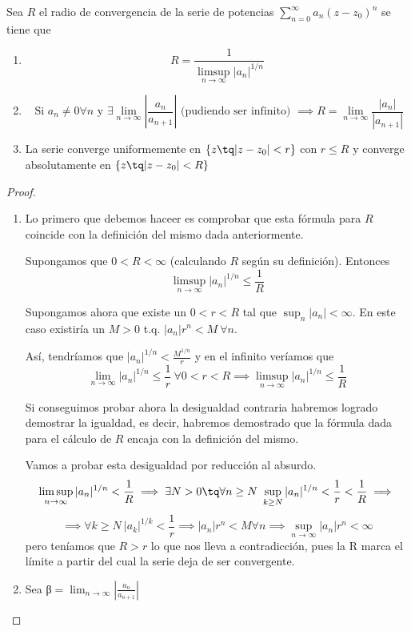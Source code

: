 \documentclass{apuntes}
\begin{document}
\begin{theorem}
Sea $R$ el radio de convergencia de la serie de potencias $\sum_{n=0}^{\infty} a_n (z-z_0)^n$ se tiene que
\begin{enumerate}
\item \[R = \frac{1}{\limsup_{n \to \infty} |a_n|^{1/n}}\]
\item
\[\text{ Si } a_n \neq 0 \forall n \text{ y }\exists \lim_{n \to \infty} \left|\frac{a_n}{a_{n+1}}\right| \text{ (pudiendo ser infinito) } \implies R = \lim_{n \to \infty}\frac{|a_n|}{|a_{n+1}|}\]
\item
La serie converge uniformemente en $\{z \tq |z-z_0| < r\}$ con $r \leq R$ y converge absolutamente en $\{z \tq |z-z_0|<R\}$
\end{enumerate}
\end{theorem}
\begin{proof}

\begin{enumerate}
\item Lo primero que debemos haceer es comprobar que esta fórmula para $R$ coincide con la definición del mismo dada anteriormente.

Supongamos que $0<R<\infty$ (calculando $R$ según su definición). Entonces
\[\limsup_{n \to \infty} |a_n|^{1/n} \leq \frac{1}{R}\]

Supongamos ahora que existe un $0<r<R$ tal que $\sup_n |a_n|<\infty$. En este caso existiría un $M>0$ t.q. $|a_n|r^n < M \ \forall n$.

Así, tendríamos que $|a_n|^{1/n} < \frac{M^{1/n}}{r}$ y en el infinito veríamos que
\[\lim_{n \to \infty} |a_n|^{1/n} \leq \frac{1}{r} \ \forall 0<r < R \implies \limsup_{n \to \infty}|a_n|^{1/n} \leq \frac{1}{R}\]

Si conseguimos probar ahora la desigualdad contraria habremos logrado demostrar la igualdad, es decir, habremos demostrado que la fórmula dada para el cálculo de $R$ encaja con la definición del mismo.

Vamos a probar esta desigualdad por reducción al absurdo.
\[\limsup_{n \to \infty}|a_n|^{1/n} < \frac{1}{R} \implies \exists N > 0 \tq \forall n \geq N \ \sup_{k \geq N} |a_n|^{1/n} < \frac{1}{r} < \frac{1}{R} \implies\]
\[\implies \forall k \geq N \ |a_k|^{1/k} < \frac{1}{r} \implies |a_n| r^n < M \forall n \implies \sup_{n\to\infty}|a_n|r^n< \infty\]
pero teníamos que $R > r$ lo que nos lleva a contradicción, pues la R marca el límite a partir del cual la serie deja de ser convergente.
\item
Sea β$= \lim_{n \to \infty}\left|\frac{a_n}{a_{n+1}} \right|$


\end{enumerate}
\end{proof}
\end{document}
